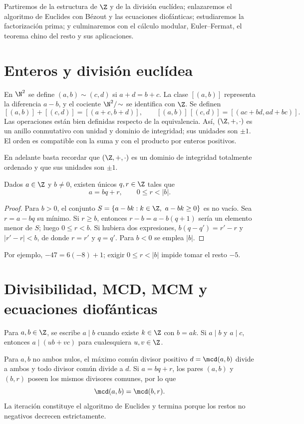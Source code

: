 \documentclass[10pt,a4paper]{article}
\begin{document}
Partiremos de la estructura de $\Z$ y de la división euclídea; enlazaremos el algoritmo de Euclides con Bézout y las ecuaciones diofánticas; estudiaremos la factorización prima; y culminaremos con el cálculo modular, Euler--Fermat, el teorema chino del resto y sus aplicaciones.

\section{Enteros y división euclídea}
\begin{ampliacion}
En $\N^2$ se define $(a,b)\sim(c,d)$ si $a+d=b+c$. La clase $[(a,b)]$ representa la diferencia $a-b$, y el cociente $\N^2/\!\sim$ se identifica con $\Z$. Se definen
\[
[(a,b)]+[(c,d)]=[(a+c,b+d)],\qquad
[(a,b)]\,[(c,d)]=[(ac+bd,ad+bc)].
\]
Las operaciones están bien definidas respecto de la equivalencia. Así, $(\Z,+,\cdot)$ es un anillo conmutativo con unidad y dominio de integridad; sus unidades son $\pm1$. El orden es compatible con la suma y con el producto por enteros positivos.
\end{ampliacion}

En adelante basta recordar que $(\Z,+,\cdot)$ es un dominio de integridad totalmente ordenado y que sus unidades son $\pm1$.

\begin{teorema}
Dados $a\in\Z$ y $b\ne0$, existen únicos $q,r\in\Z$ tales que
\[
a=bq+r,\qquad 0\le r<|b|.
\]
\end{teorema}
\begin{proof}
Para $b>0$, el conjunto $S=\{a-bk:k\in\Z,\ a-bk\ge0\}$ es no vacío. Sea $r=a-bq$ su mínimo. Si $r\ge b$, entonces $r-b=a-b(q+1)$ sería un elemento menor de $S$; luego $0\le r<b$. Si hubiera dos expresiones, $b(q-q')=r'-r$ y $|r'-r|<b$, de donde $r=r'$ y $q=q'$. Para $b<0$ se emplea $|b|$.
\end{proof}
Por ejemplo, $-47=6(-8)+1$; exigir $0\le r<|b|$ impide tomar el resto $-5$.

\section{Divisibilidad, MCD, MCM y ecuaciones diofánticas}
Para $a,b\in\Z$, se escribe $a\mid b$ cuando existe $k\in\Z$ con $b=ak$. Si $a\mid b$ y $a\mid c$, entonces $a\mid(ub+vc)$ para cualesquiera $u,v\in\Z$.

Para $a,b$ no ambos nulos, el máximo común divisor positivo $d=\mcd(a,b)$ divide a ambos y todo divisor común divide a $d$. Si $a=bq+r$, los pares $(a,b)$ y $(b,r)$ poseen los mismos divisores comunes, por lo que
\[
\mcd(a,b)=\mcd(b,r).
\]
La iteración constituye el algoritmo de Euclides y termina porque los restos no negativos decrecen estrictamente.
\end{document}
